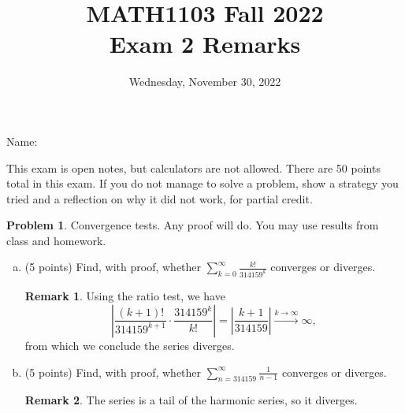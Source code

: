 \documentclass[11pt,oneside]{amsart}
\title{MATH1103 Fall 2022\\
Exam 2 Remarks}
\author{Wednesday, November 30, 2022}
\theoremstyle{definition}
\newtheorem{problem}{Problem}
\newtheorem*{remark}{Remark}
\begin{document}
\maketitle

Name: \underline{\hspace{6cm}}

This exam is open notes, but calculators are not allowed. There are 50 points total in this exam. If you do not manage to solve a problem, show a strategy you tried and a reflection on why it did not work, for partial credit.

\begin{problem}
Convergence tests. Any proof will do. You may use results from class and homework.
\begin{enumerate}[(a)]
  \item (5 points) Find, with proof, whether $\displaystyle\sum_{k=0}^\infty \frac{k!}{314159^k}$ converges or diverges.
        \begin{remark}
          Using the ratio test, we have
          \[\left|\frac{(k+1)!}{314159^{k+1}}\cdot\frac{314159^k}{k!}\right|=\left|\frac{k+1}{314159}\right|\xrightarrow{k\to\infty}\infty,\]
          from which we conclude the series diverges.
        \end{remark}
        \vfill
  \item (5 points) Find, with proof, whether $\displaystyle\sum_{n=314159}^\infty\frac 1{n-1}$ converges or diverges.
        \begin{remark}
          The series is a tail of the harmonic series, so it diverges.
        \end{remark}
        \vfill
\end{enumerate}
\end{problem}

\newpage
\end{document}
